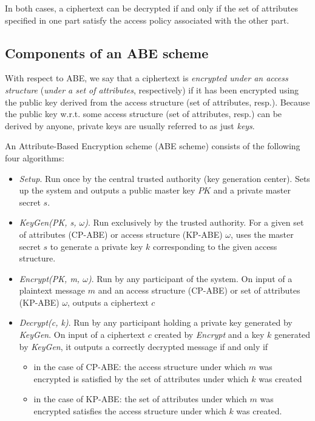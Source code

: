 In both cases, a ciphertext can be decrypted if and only if the set of attributes specified in one part satisfy the access policy associated with the other part.



\subsection{Components of an ABE scheme}

With respect to ABE, we say that a ciphertext is \emph{encrypted under an access structure} (\emph{under a set of attributes}, respectively) if it has been encrypted using the public key derived from the access structure (set of attributes, resp.).
Because the public key w.r.t. some access structure (set of attributes, resp.) can be derived by anyone, private keys are usually referred to as just \emph{keys}.

\begin{definition}
    An Attribute-Based Encryption scheme (ABE scheme) consists of the following four algorithms:~\cite{goyal_attribute-based_2006}
    \begin{itemize}
        \item \emph{Setup}. Run once by the central trusted authority (key generation center). Sets up the system and outputs a public master key $PK$ and a private master secret $s$.
        \item \emph{KeyGen(PK, s, $\omega$)}. Run exclusively by the trusted authority. For a given set of attributes (CP-ABE) or access structure (KP-ABE) $\omega$, uses the master secret $s$ to generate a private key $k$ corresponding to the given access structure.
        \item \emph{Encrypt(PK, m, $\omega$)}. Run by any participant of the system. On input of a plaintext message $m$ and an access structure (CP-ABE) or set of attributes (KP-ABE) $\omega$, outputs a ciphertext $c$
        \item \emph{Decrypt(c, k)}. Run by any participant holding a private key generated by \emph{KeyGen}. On input of a ciphertext $c$ created by \emph{Encrypt} and a key $k$ generated by \emph{KeyGen}, it outputs a correctly decrypted message if and only if
        \begin{itemize}
            \item in the case of CP-ABE: the access structure under which $m$ was encrypted is satisfied by the set of attributes under which $k$ was created
            \item in the case of KP-ABE: the set of attributes under which $m$ was encrypted satisfies the access structure under which $k$ was created.
        \end{itemize}
    \end{itemize}
\end{definition}

